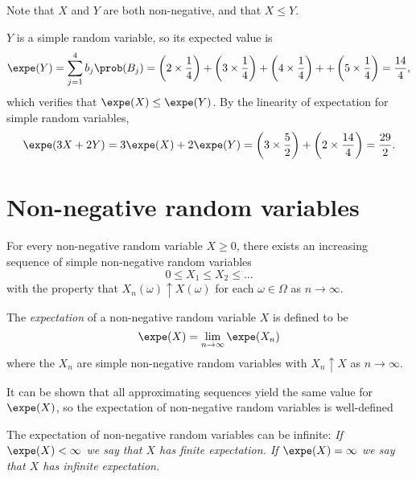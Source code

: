 \newpage
\begin{solution}
Note that $X$ and $Y$ are both non-negative, and that $X\leq Y$.%
\par
$Y$ is a simple random variable, so its expected value is
\[
\expe(Y) 
	= \sum_{j=1}^4 b_j \prob(B_j) 
	= \left(2\times\frac{1}{4}\right) +\left(3\times\frac{1}{4}\right) +\left(4\times\frac{1}{4}\right) + +\left(5\times\frac{1}{4}\right)
	= \frac{14}{4},
\]
which verifies that $\expe(X)\leq\expe(Y)$. By the linearity of expectation for simple random variables, 
\[
\expe(3X+2Y)
	= 3\expe(X) + 2\expe(Y)
	= \left(3\times\frac{5}{2}\right) + \left(2\times\frac{14}{4}\right)
	= \frac{29}{2}.
\]
\end{solution}

\section{Non-negative random variables}\label{sec:expe_non-negative}

\begin{theorem}
For every non-negative random variable $X\geq 0$, there exists an increasing sequence of simple non-negative random variables
\[
0\leq X_1\leq X_2\leq \ldots
\]
with the property that $X_n(\omega)\uparrow X(\omega)$ for each $\omega\in\Omega$ as $n\to\infty$.
\end{theorem}

\proofomitted

\begin{definition}\label{def:expe_non-negative}
The \emph{expectation} of a non-negative random variable $X$ is defined to be
\[
\expe(X) = \lim_{n\to\infty}\expe(X_n)
\]
where the $X_n$ are simple non-negative random variables with $X_n\uparrow X$ as $n\to\infty$.
\end{definition}

\begin{remark}
It can be shown that all approximating sequences yield the same value for $\expe(X)$, so the expectation of non-negative random variables is well-defined
\end{remark}

\begin{remark}
The expectation of non-negative random variables can be infinite:
\ben
\it If $\expe(X)<\infty$ we say that $X$ has \emph{finite} expectation.
\it If $\expe(X)=\infty$ we say that $X$ has \emph{infinite} expectation.
\een
\end{remark}

